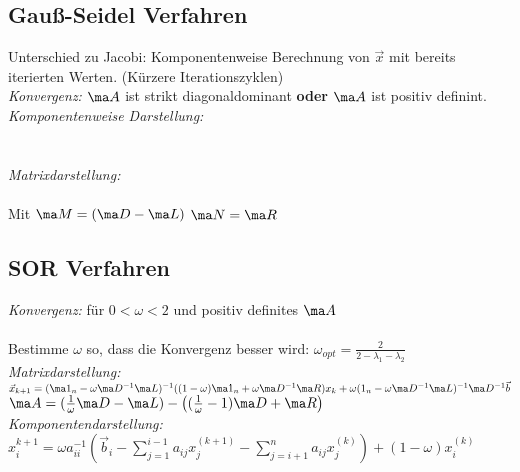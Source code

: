 \documentclass[fs, footer]{latex4ei}
\begin{document}
\begin{sectionbox}
\begin{sectionbox}
\begin{sectionbox}
	\subsection{Gauß-Seidel Verfahren}
	Unterschied zu Jacobi: Komponentenweise Berechnung von $\vec x$ mit bereits iterierten Werten. (Kürzere Iterationszyklen)\\[0.5em]
	\emph{Konvergenz:} $\ma A$ ist strikt diagonaldominant \textbf{oder} $\ma A$ ist positiv definint.\\
	\emph{Komponentenweise Darstellung:} \\ \\
	\\
	\emph{Matrixdarstellung:}\\
	\\[0.5em]
	Mit $\ma M = (\ma D - \ma L)$ \qquad $\ma N = \ma R$
\end{sectionbox}

\begin{sectionbox}
	\subsection{SOR Verfahren}
	\emph{Konvergenz:} für $0  < \omega < 2$ und positiv definites $\ma A$\\
	\\ %
	Bestimme $\omega$ so, dass die Konvergenz besser wird: $\omega_{opt} = \frac{2}{2 - \lambda_1 - \lambda_2}$\\
	
	
	\emph{Matrixdarstellung:}\\
	$\vec x_{k+1} = (\ma 1_n - \omega \ma D^{-1} \ma L)^{-1} (( 1 - \omega) \ma 1_n + \omega \ma D^{-1} \ma R) x_k + \omega (1_n - \omega \ma D^{-1} \ma L)^{-1} \ma D^{-1} \vec b$ \\
	$\ma A = (\frac{1}{\omega} \ma D - \ma L) - \left((\frac{1}{\omega} - 1) \ma D + \ma R \right)$\\
	
	\emph{Komponentendarstellung:}\\
	$x_i^{k+1} = \omega a_{ii}^{-1} \left( \vec b_i - \sum\limits_{j=1}^{i-1} a_{ij} x_j^{(k+1)} - \sum\limits_{j = i +1}^{n} a_{ij} x_j^{(k)} \right) + (1 - \omega) x_i^{(k)}$
\end{sectionbox}



\end{sectionbox}
\end{sectionbox}
\end{document}

